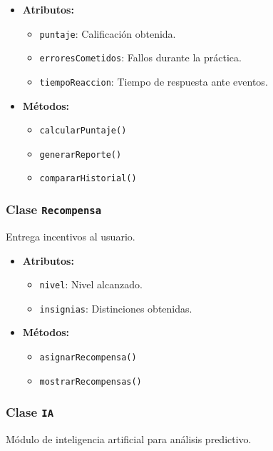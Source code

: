 \documentclass[12pt]{article}
\begin{document}
	\begin{itemize}
		\item \textbf{Atributos:}
		\begin{itemize}
			\item \texttt{puntaje}: Calificación obtenida.
			\item \texttt{erroresCometidos}: Fallos durante la práctica.
			\item \texttt{tiempoReaccion}: Tiempo de respuesta ante eventos.
		\end{itemize}
		\item \textbf{Métodos:}
		\begin{itemize}
			\item \texttt{calcularPuntaje()}
			\item \texttt{generarReporte()}
			\item \texttt{compararHistorial()}
		\end{itemize}
	\end{itemize}
	
	\subsubsection*{Clase \texttt{Recompensa}}
	Entrega incentivos al usuario.
	
	\begin{itemize}
		\item \textbf{Atributos:}
		\begin{itemize}
			\item \texttt{nivel}: Nivel alcanzado.
			\item \texttt{insignias}: Distinciones obtenidas.
		\end{itemize}
		\item \textbf{Métodos:}
		\begin{itemize}
			\item \texttt{asignarRecompensa()}
			\item \texttt{mostrarRecompensas()}
		\end{itemize}
	\end{itemize}
	
	\subsubsection*{Clase \texttt{IA}}
	Módulo de inteligencia artificial para análisis predictivo.
	
\end{document}
